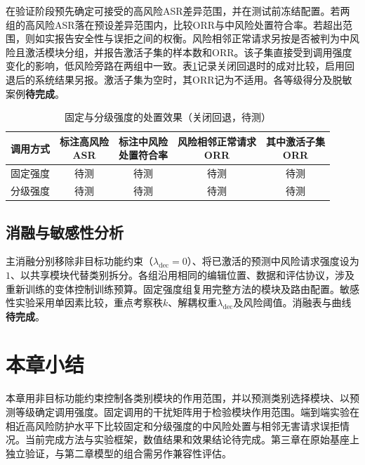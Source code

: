 在验证阶段预先确定可接受的高风险ASR差异范围，并在测试前冻结配置。若两组的高风险ASR落在预设差异范围内，比较ORR与中风险处置符合率。若超出范围，则如实报告安全性与误拒之间的权衡。风险相邻正常请求另按是否被判为中风险且激活模块分组，并报告激活子集的样本数和ORR。该子集直接受到调用强度变化的影响，低风险旁路在两组中一致。表\ref{tab:ch3-graded-results}记录关闭回退时的成对比较，启用回退后的系统结果另报。激活子集为空时，其ORR记为不适用。各等级得分及脱敏案例\textbf{待完成}。

\begin{table}[htbp]
 \centering
 \caption{固定与分级强度的处置效果（关闭回退，待测）}
 \label{tab:ch3-graded-results}
 \setlength{\tabcolsep}{4pt}
 \begin{tabular}{@{}lcccc@{}}
 \toprule
 调用方式 & \shortstack{标注高风险\\ASR} & \shortstack{标注中风险\\处置符合率} &
 \shortstack{风险相邻正常请求\\ORR} & \shortstack{其中激活子集\\ORR}\\ \midrule
 固定强度 & 待测 & 待测 & 待测 & 待测\\
 分级强度 & 待测 & 待测 & 待测 & 待测\\
 \bottomrule
 \end{tabular}
\end{table}

\subsection{消融与敏感性分析}

主消融分别移除非目标功能约束（$\lambda_{\mathrm{dec}}=0$）、将已激活的预测中风险请求强度设为$1$、以共享模块代替类别拆分。各组沿用相同的编辑位置、数据和评估协议，涉及重新训练的变体控制训练预算。固定强度组复用完整方法的模块及路由配置。敏感性实验采用单因素比较，重点考察秩$k$、解耦权重$\lambda_{\mathrm{dec}}$及风险阈值。消融表与曲线\textbf{待完成}。

\section{本章小结}

本章用非目标功能约束控制各类别模块的作用范围，并以预测类别选择模块、以预测等级确定调用强度。固定调用的干扰矩阵用于检验模块作用范围。端到端实验在相近高风险防护水平下比较固定和分级强度的中风险处置与相邻无害请求误拒情况。当前完成方法与实验框架，数值结果和效果结论待完成。第三章在原始基座上独立验证，与第二章模型的组合需另作兼容性评估。
